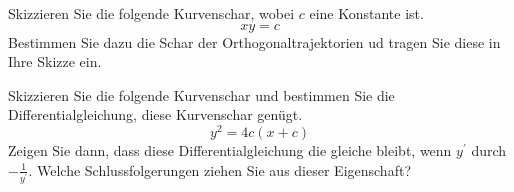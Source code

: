 \begin{atiTask}[
	title = Orthogonaltrajektorien,
	points = 10
]
\label{task:3}
	\begin{atiSubtasks}
		\item Skizzieren Sie die folgende Kurvenschar, wobei $c$ eine Konstante ist.
		\[
			xy = c
		\]
		Bestimmen Sie dazu die Schar der Orthogonaltrajektorien ud tragen Sie diese in Ihre Skizze ein.

		\item
		Skizzieren Sie die folgende Kurvenschar und bestimmen Sie die Differentialgleichung, diese Kurvenschar genügt.
		\[
			y^2 = 4c(x+c)
		\]
		Zeigen Sie dann, dass diese Differentialgleichung die gleiche bleibt, wenn $y^\prime$ durch $-\frac{1}{y^\prime}$.
		Welche Schlussfolgerungen ziehen Sie aus dieser Eigenschaft?
	\end{atiSubtasks}
\end{atiTask}

